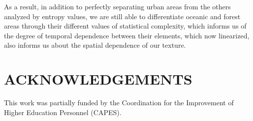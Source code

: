 \documentclass{isprs}
\begin{document}
As a result, in addition to perfectly separating urban areas from the others analyzed by entropy values, we are still able to differentiate oceanic and forest areas through their different values of statistical complexity, which informs us of the degree of temporal dependence between their elements, which now linearized, also informs us about the spatial dependence of our texture.
	

%

	
\section*{ACKNOWLEDGEMENTS}\label{ACKNOWLEDGEMENTS}
	
This work was partially funded by the Coordination for the Improvement of Higher Education Personnel (CAPES).
\end{document}
